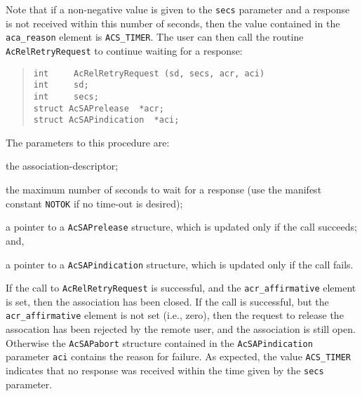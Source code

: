 Note that if a non-negative value is given to the \verb"secs" parameter and a
response is not received within this number of seconds,
then the value contained in the \verb"aca_reason" element is \verb"ACS_TIMER".
The user can then call the routine \verb"AcRelRetryRequest" to continue waiting
for a response:
\begin{quote}\small\begin{verbatim}
int     AcRelRetryRequest (sd, secs, acr, aci)
int     sd;
int     secs;
struct AcSAPrelease  *acr;
struct AcSAPindication  *aci;
\end{verbatim}\end{quote}
The parameters to this procedure are:
\begin{describe}
\item[\verb"sd":] the association-descriptor;

\item[\verb"secs":] the maximum number of seconds to wait for a response
(use the manifest constant \verb"NOTOK" if no time-out is desired);

\item[\verb"acr":] a pointer to a \verb"AcSAPrelease" structure, which is
updated only if the call succeeds;
and,

\item[\verb"aci":] a pointer to a \verb"AcSAPindication" structure, which is
updated only if the call fails.
\end{describe}
If the call to \verb"AcRelRetryRequest" is successful,
and the \verb"acr_affirmative" element is set,
then the association has been closed.
If the call is successful,
but the \verb"acr_affirmative" element is not set (i.e., zero),
then the request to release the assocation has been rejected by the remote
user, and the association is still open.
Otherwise the \verb"AcSAPabort" structure contained in
the \verb"AcSAPindication" parameter
\verb"aci" contains the reason for failure.
As expected,
the value \verb"ACS_TIMER" indicates that no response was received within the
time given by the \verb"secs" parameter.

